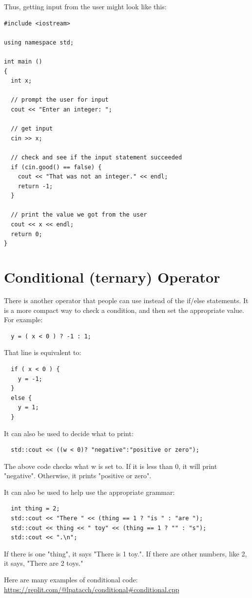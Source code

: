 Thus, getting input from the user might look like this:

\begin{verbatim}
#include <iostream>

using namespace std;

int main ()
{
  int x;

  // prompt the user for input
  cout << "Enter an integer: ";

  // get input
  cin >> x;

  // check and see if the input statement succeeded
  if (cin.good() == false) {
    cout << "That was not an integer." << endl;
    return -1;
  }

  // print the value we got from the user
  cout << x << endl;
  return 0;
}
\end{verbatim}
%

\section{Conditional (ternary) Operator}
There is another operator that people can use instead of the 
if/else statements. It is a more compact way to check a condition,
and then set the appropriate value. For example:
\begin{lstlisting}
  y = ( x < 0 ) ? -1 : 1;
\end{lstlisting}
That line is equivalent to:
\begin{lstlisting}
  if ( x < 0 ) {
    y = -1;
  }
  else {
    y = 1;
  }
\end{lstlisting}
It can also be used to decide what to print:
\begin{lstlisting}
  std::cout << ((w < 0)? "negative":"positive or zero");
\end{lstlisting}
The above code checks what w is set to. If it is less than 0, it 
will print "negative". Otherwise, it prints "positive or zero".

It can also be used to help use the appropriate grammar:
\begin{lstlisting}
  int thing = 2;
  std::cout << "There " << (thing == 1 ? "is " : "are ");
  std::cout << thing << " toy" << (thing == 1 ? "" : "s");
  std::cout << ".\n";
\end{lstlisting}
If there is one "thing", it says "There is 1 toy.". If there are other
numbers, like 2, it says, "There are 2 toys."


Here are many examples of conditional code: 
\url{https://replit.com/@lpatacch/conditional#conditional.cpp}
